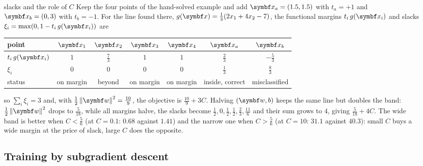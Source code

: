 \documentclass[11pt]{article}
\newcommand{\w}{\vect{w}}
\begin{document}
\begin{worked}{slacks and the role of $C$}
Keep the four points of the hand-solved example and add $\x_a = (1.5, 1.5)$ with $t_a = +1$ and $\x_b = (0, 3)$ with $t_b =
-1$. For the line found there, $g(\x) = \frac13(2x_1 + 4x_2 - 7)$, the functional margins $t_i\,g(\x_i)$ and slacks
$\xi_i = \max(0, 1 - t_i\,g(\x_i))$ are
\begin{center}\small\renewcommand{\arraystretch}{1.25}
\begin{tabular}{@{}lcccccc@{}}
\toprule
point & $\x_1$ & $\x_2$ & $\x_3$ & $\x_4$ & $\x_a$ & $\x_b$ \\
\midrule
$t_i\,g(\x_i)$ & $1$ & $\frac73$ & $1$ & $1$ & $\frac23$ & $-\frac53$ \\
$\xi_i$ & $0$ & $0$ & $0$ & $0$ & $\frac13$ & $\frac83$ \\
status & on margin & beyond & on margin & on margin & inside, correct & misclassified \\
\bottomrule
\end{tabular}
\end{center}
so $\sum_i\xi_i = 3$ and, with $\frac12\norm{\w}^2 = \frac{10}{9}$, the objective is $\frac{10}{9} + 3C$. Halving $(\w, b)$
keeps the same line but doubles the band: $\frac12\norm{\w}^2$ drops to $\frac{5}{18}$, while all margins halve, the slacks
become $\frac12, 0, \frac12, \frac12, \frac23, \frac{11}{6}$ and their sum grows to $4$, giving $\frac{5}{18} + 4C$. The
wide band is better when $C < \frac56$ (at $C = 0.1$: $0.68$ against $1.41$) and the narrow one when $C > \frac56$ (at $C =
10$: $31.1$ against $40.3$): small $C$ buys a wide margin at the price of slack, large $C$ does the opposite.
\end{worked}

\subsection{Training by subgradient descent}
\end{document}
